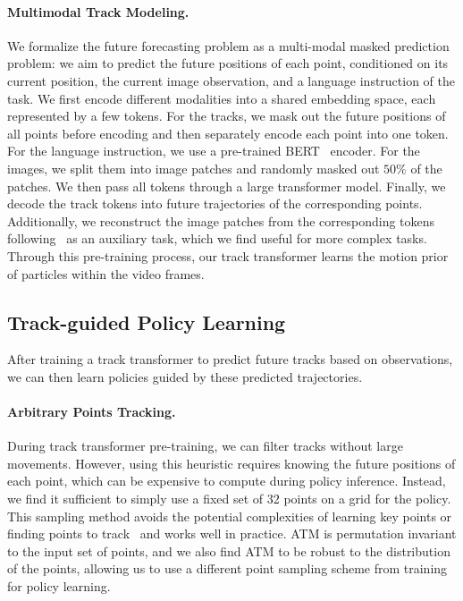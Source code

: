 \paragraph{Multimodal Track Modeling.}
We formalize the future forecasting problem as a multi-modal masked prediction problem: we aim to predict the future positions of each point, conditioned on its current position, the current image observation, and a language instruction of the task. We first encode different modalities into a shared embedding space, each represented by a few tokens. For the tracks, we mask out the future positions of all points before encoding and then separately encode each point into one token. For the language instruction, we use a pre-trained BERT~\cite{devlin2019-bert} encoder. For the images, we split them into image patches and randomly masked out $50\%$ of the patches. We then pass all tokens through a large transformer model. Finally, we decode the track tokens into future trajectories of the corresponding points. Additionally, we reconstruct the image patches from the corresponding tokens following~\citet{he2022masked} as an auxiliary task, which we find useful for more complex tasks. Through this pre-training process, our track transformer learns the motion prior of particles within the video frames.


\subsection{Track-guided Policy Learning}\label{sec:track-policy}
After training a track transformer to predict future tracks based on observations, we can then learn policies guided by these predicted trajectories.

\paragraph{Arbitrary Points Tracking.} During track transformer pre-training, we can filter tracks without large movements. However, using this heuristic requires knowing the future positions of each point, which can be expensive to compute during policy inference. Instead, we find it sufficient to simply use a fixed set of 32 points on a grid for the policy. This sampling method avoids the potential complexities of learning key points or finding points to track~\cite{vecerik2023robotap} and works well in practice. ATM is permutation invariant to the input set of points, and we also find ATM to be robust to the distribution of the points, allowing us to use a different point sampling scheme from training for policy learning.

